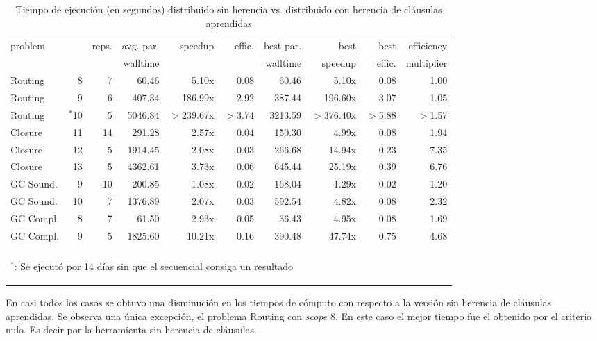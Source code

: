 \begin{table}
	\scriptsize
	\begin{tabular}{lrrrrrrrrr}
		\toprule
		problem	&			&	reps.	& avg. par.		&	speedup	&	effic.		& best par.	& best 		& best			& efficiency \\
				&			&	 		& walltime	&			&	 			& walltime		& speedup 	& effic.	& multiplier \\
		\cmidrule(r){1-10}
		Routing	&	8		&		7 	& 60.46			& 5.10x		&	0.08 		& 60.46			&	5.10x	& 0.08			& 1.00
\\
		Routing	&	9		&	6 		& 407.34		& 	186.99x	&	2.92 		& 387.44		& 196.60x	& 3.07			& 1.05
\\
		Routing	&	$^*$10	&	5 		& 5046.84		&$>$239.67x	&	$>$3.74 	& 3213.59		& $>$376.40x	& $>$5.88			& $>$1.57
\\
		\cmidrule(r){1-10}
		Closure	&	11		&	14 		& 291.28		&	2.57x	&	0.04 		& 150.30		&  4.99x	& 0.08			& 1.94
\\		Closure	&	12		&	5 		& 1914.45		&	2.08x	&	0.03 		& 266.68		& 14.94x	& 0.23			& 7.35
\\		Closure	&	13		& 5 		&	4362.61		&	3.73x	&	0.06 		& 645.44		& 25.19x	& 0.39			& 6.76
\\
		\cmidrule(r){1-10}
		GC Sound.&	9	&	10 		& 200.85		&	1.08x	&	0.02 		& 168.04		& 1.29x		& 0.02			& 1.20
\\
		GC Sound.&	10	&	7 		& 1376.89		&	2.07x	&	0.03 		& 592.54		& 4.82x		& 0.08			& 2.32
\\
		\cmidrule(r){1-10}
		GC Compl.	& 8	&	7 		& 61.50			&	2.93x	&	0.05 		& 36.43			& 4.95x		& 0.08			& 1.69
\\
		GC Compl.	& 9	&	5 		& 1825.60		&	10.21x	&	0.16 		& 390.48		& 47.74x	& 0.75			& 4.68
\\
		\bottomrule
		\\
		\multicolumn{10}{l}{\begin{tiny}$^*$: Se ejecutó por 14 días sin que el \ssolver secuencial consiga un resultado\end{tiny}}
	\end{tabular}
	\caption{Tiempo de ejecución (en segundos) distribuido sin herencia vs. distribuido con herencia de cláusulas aprendidas}
	\label{tab:mejorlearning}
\end{table}

En casi todos los casos se obtuvo una disminución en los tiempos de cómputo
con respecto a la versión sin herencia de cláusulas aprendidas. Se observa una
única excepción, el problema Routing con \emph{scope} 8. En este caso el mejor
tiempo fue el obtenido por el criterio nulo. Es decir por la herramienta sin
herencia de cláusulas.

